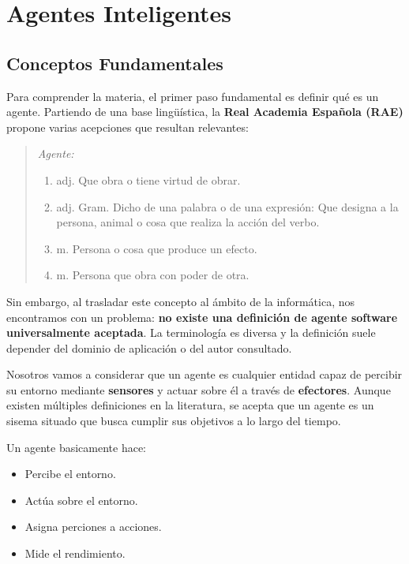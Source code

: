 \chapter{Agentes Inteligentes}
\section{Conceptos Fundamentales}

Para comprender la materia, el primer paso fundamental es definir qué es un agente. Partiendo de una base lingüística, la \textbf{Real Academia Española (RAE)} propone varias acepciones que resultan relevantes:

\begin{quote}
\textit{Agente:} 
\begin{enumerate}
    \item adj. Que obra o tiene virtud de obrar.
    \item adj. Gram. Dicho de una palabra o de una expresión: Que designa a la persona, animal o cosa que realiza la acción del verbo.
    \item m. Persona o cosa que produce un efecto. 
    \item m. Persona que obra con poder de otra.
\end{enumerate}
\end{quote}


Sin embargo, al trasladar este concepto al ámbito de la informática, nos encontramos con un problema: \textbf{no existe una definición de agente software universalmente aceptada}. La terminología es diversa y la definición suele depender del dominio de aplicación o del autor consultado.

\medskip
Nosotros vamos a considerar que un agente es cualquier entidad capaz de percibir su entorno mediante \textbf{sensores} y actuar sobre él a través de \textbf{efectores}. Aunque existen múltiples definiciones en la literatura, se acepta que un agente es un sisema situado que busca cumplir sus objetivos a lo largo del tiempo.

\medskip
Un agente basicamente hace:

\begin{itemize}
    \item Percibe el entorno.
    \item Actúa sobre el entorno.
    \item Asigna perciones a acciones.
    \item Mide el rendimiento.
\end{itemize}

